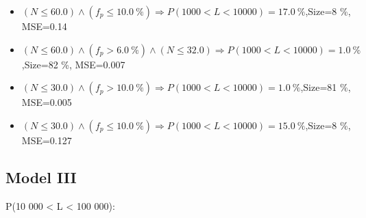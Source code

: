 \documentclass[numbered]{CSL}
\begin{document}
\begin{itemize}
\item $(N \leq 60.0) \land (f_p \leq 10.0~\%) \Rightarrow P(1 000 < L < 10 000) = 17.0~\%$,\hfill Size=8 \%, MSE=0.14
\item $(N \leq 60.0) \land (f_p > 6.0~\%) \land (N \leq 32.0) \Rightarrow P(1 000 < L < 10 000) = 1.0~\%$,\hfill Size=82 \%, MSE=0.007
\item $(N \leq 30.0) \land (f_p > 10.0~\%) \Rightarrow P(1 000 < L < 10 000) = 1.0~\%$,\hfill Size=81 \%, MSE=0.005
\item $(N \leq 30.0) \land (f_p \leq 10.0~\%) \Rightarrow P(1 000 < L < 10 000) = 15.0~\%$,\hfill Size=8 \%, MSE=0.127
\end{itemize}

\subsection{Model III}
P(10 000 < L < 100 000):
\end{document}
